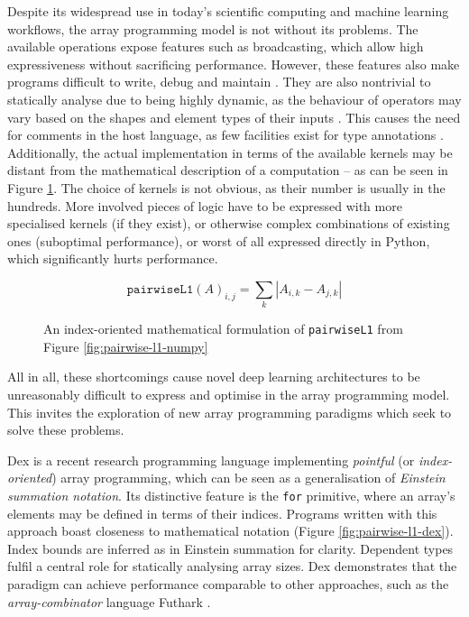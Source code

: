Despite its widespread use in today's scientific computing and machine learning workflows, the array programming model is not without its problems. The available operations expose features such as broadcasting, which allow high expressiveness without sacrificing performance. However, these features also make programs difficult to write, debug and maintain \cite{Paszke2021GettingTT}. They are also nontrivial to statically analyse due to being highly dynamic, as the behaviour of operators may vary based on the shapes and element types of their inputs \cite{Liu_2020}. This causes the need for comments in the host language, as few facilities exist for type annotations \cite{Rush_2018}. Additionally, the actual implementation in terms of the available kernels may be distant from the mathematical description of a computation -- as can be seen in Figure \ref{fig:pairwise-l1-math}. The choice of kernels is not obvious, as their number is usually in the hundreds. More involved pieces of logic have to be expressed with more specialised kernels (if they exist), or otherwise complex  combinations of existing ones (suboptimal performance), or worst of all expressed directly in Python, which significantly hurts performance.

\begin{figure}[h]
    \centering
    $$ \texttt{pairwiseL1}(A)_{i,j} = \sum_{k} \left| A_{i,k} - A_{j,k} \right|  $$
    \caption{An index-oriented mathematical formulation of \texttt{pairwiseL1} from Figure \ref{fig:pairwise-l1-numpy}}
    \label{fig:pairwise-l1-math}
\end{figure}

All in all, these shortcomings cause novel deep learning architectures to be unreasonably difficult to express and optimise in the array programming model. This invites the exploration of new array programming paradigms which seek to solve these problems.

Dex \cite{Paszke2021GettingTT} is a recent research programming language implementing \textit{pointful} (or \textit{index-oriented}) array programming, which can be seen as a generalisation of \textit{Einstein summation notation}. Its distinctive feature is the \texttt{for} primitive, where an array's elements may be defined in terms of their indices. Programs written with this approach boast closeness to mathematical notation (Figure \ref{fig:pairwise-l1-dex}). Index bounds are inferred as in Einstein summation for clarity. Dependent types fulfil a central role for statically analysing array sizes. Dex demonstrates that the paradigm can achieve performance comparable to other approaches, such as the \textit{array-combinator} language Futhark \cite{Henriksen:2017:FPF:3062341.3062354}.

